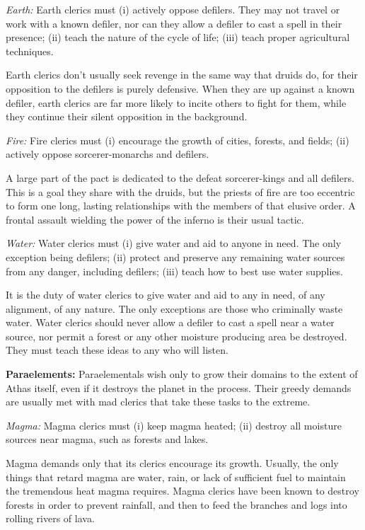 \textit{Earth:} Earth clerics must
	(i) actively oppose defilers. They may not travel or work with a known defiler, nor can they allow a defiler to cast a spell in their presence;
	(ii) teach the nature of the cycle of life;
	(iii) teach proper agricultural techniques.

Earth clerics don't usually seek revenge in the same way that druids do, for their opposition to the defilers is purely defensive. When they are up against a known defiler, earth clerics are far more likely to incite others to fight for them, while they continue their silent opposition in the background.

\textit{Fire:} Fire clerics must
	(i) encourage the growth of cities, forests, and fields;
	(ii) actively oppose sorcerer-monarchs and defilers.

A large part of the pact is dedicated to the defeat sorcerer-kings and all defilers. This is a goal they share with the druids, but the priests of fire are too eccentric to form one long, lasting relationships with the members of that elusive order. A frontal assault wielding the power of the inferno is their usual tactic.

\textit{Water:} Water clerics must
	(i) give water and aid to anyone in need. The only exception being defilers;
	(ii) protect and preserve any remaining water sources from any danger, including defilers;
	(iii) teach how to best use water supplies.

It is the duty of water clerics to give water and aid to any in need, of any alignment, of any nature. The only exceptions are those who criminally waste water. Water clerics should never allow a defiler to cast a spell near a water source, nor permit a forest or any other moisture producing area be destroyed. They must teach these ideas to any who will listen.

\textbf{Paraelements:} Paraelementals wish only to grow their domains to the extent of Athas itself, even if it destroys the planet in the process. Their greedy demands are usually met with mad clerics that take these tasks to the extreme.

\textit{Magma:} Magma clerics must
	(i) keep magma heated;
	(ii) destroy all moisture sources near magma, such as forests and lakes.

Magma demands only that its clerics encourage its growth. Usually, the only things that retard magma are water, rain, or lack of sufficient fuel to maintain the tremendous heat magma requires. Magma clerics have been known to destroy forests in order to prevent rainfall, and then to feed the branches and logs into rolling rivers of lava.

